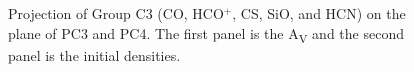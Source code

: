 \documentclass{aa}
\begin{document}
\begin{CJK*}{UTF8}{gbsn}
    \begin{figure}[htbp]
        \centering
        \caption{Projection of Group C3 (CO, HCO$^+$, CS, SiO, and HCN) on the plane of PC3 and PC4. The first panel is the A\textsubscript{V} and the second panel is the initial densities.}
        \label{C3-34}
    \end{figure}


\end{CJK*}
\end{document}
